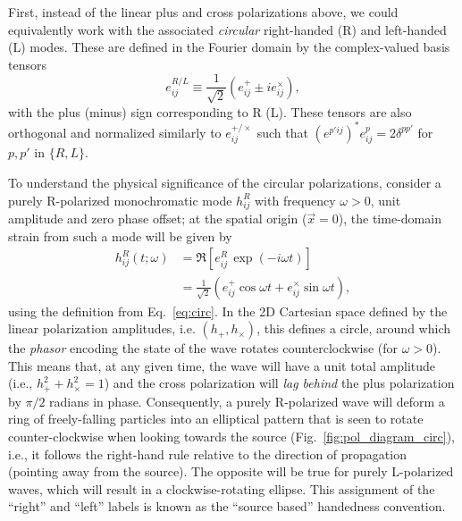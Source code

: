\documentclass[aps,prd,twocolumn,superscriptaddress,preprintnumbers,floatfix,nofootinbib]{revtex4-2}
\newcommand{\beq}{\begin{equation}}
\newcommand{\eeq}{\end{equation}}
\begin{document}
First, instead of the linear plus and cross polarizations above, we could equivalently work with the associated \emph{circular} right-handed (R) and left-handed (L) modes.
These are defined in the Fourier domain by the complex-valued basis tensors
\beq \label{eq:circ}
e^{R/L}_{ij} \equiv \frac{1}{\sqrt{2}} \left(e^+_{ij} \pm i e^\times_{ij} \right) ,
\eeq
with the plus (minus) sign corresponding to R (L).
These tensors are also orthogonal and normalized similarly to $e^{+/\times}_{ij}$ such that $(e^{p'ij})^* e^p_{ij} = 2 \delta^{pp'}$ for $p,p'$ in $\{R,L\}$.

To understand the physical significance of the circular polarizations,
consider a purely R-polarized monochromatic mode $h^R_{ij}$ with frequency $\omega > 0$, unit amplitude and zero phase offset; at the spatial origin ($\vec{x}=0$), the time-domain strain from such a mode will be given by
\begin{align} \label{eq:circ_example}
h_{ij}^R(t;\omega) &= \Re \left[ e^R_{ij}\, \exp(-i\omega t) \right] \nonumber\\
&= \frac{1}{\sqrt{2}} \left( e^+_{ij} \cos \omega t + e^\times_{ij} \sin \omega t \right) ,
\end{align}
using the definition from Eq.~\eqref{eq:circ}.
In the 2D Cartesian space defined by the linear polarization amplitudes, i.e. $\left(h_+, h_\times\right)$, this defines a circle, around which the \emph{phasor} encoding the state of the wave rotates counterclockwise (for $\omega > 0$).
This means that, at any given time, the wave will have a unit total amplitude (i.e., $h^2_+ + h^2_\times=1$) and the cross polarization will \emph{lag behind} the plus polarization by $\pi/2$ radians in phase.
%
Consequently, a purely R-polarized wave will deform a ring of freely-falling particles into an elliptical pattern that is seen to rotate counter-clockwise when looking towards the source (Fig.~\ref{fig:pol_diagram_circ}), i.e., it follows the right-hand rule relative to the direction of propagation (pointing away from the source).
The opposite will be true for purely L-polarized waves, which will result in a clockwise-rotating ellipse.
This assignment of the ``right'' and ``left'' labels is known as the ``source based'' handedness convention.
\end{document}
